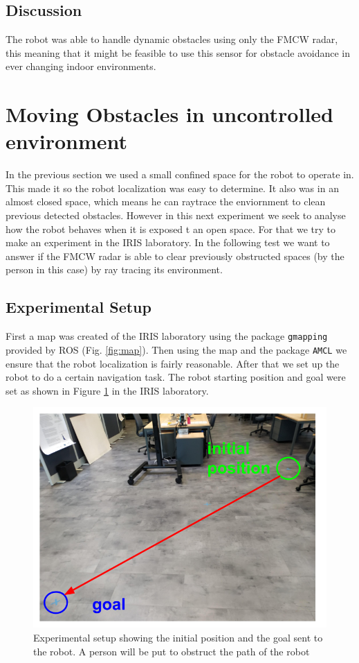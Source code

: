 \subsection{Discussion}
The robot was able to handle dynamic obstacles using only the \ac{FMCW} \ac{radar}, this meaning that it might be feasible to use this sensor for obstacle avoidance in ever changing indoor environments.

\section {Moving Obstacles in uncontrolled environment}
In the previous section we used a small confined space for the robot to operate in. This made it so the robot localization was easy to determine. It also was in an almost closed space, which means he can raytrace the enviornment to clean previous detected obstacles. However in this next experiment we seek to analyse how the robot behaves when it is exposed t an open space. For that we try to make an experiment in the \ac{IRIS} laboratory.
In the following test we want to answer  if the \ac{FMCW} \ac{radar} is  able to clear previously obstructed spaces (by the person in this case) by ray tracing its environment. 
\subsection{Experimental Setup}
First a map was created of the \ac{IRIS} laboratory using the package \texttt{gmapping} provided by \ac{ROS} (Fig. \ref{fig:map}). Then using the map and the package \texttt{\ac{AMCL}} we ensure that the robot localization is fairly reasonable. After that we set up the robot to do a certain navigation task.
The robot starting position and goal were set as shown in Figure \ref{fig:setup} in the \ac{IRIS} laboratory. 

\begin{figure}[ht!]
\centerline{\includegraphics [width=0.8 \textwidth]{imgs/chapter5/setup.png}}
\caption[Experimental setup]{Experimental setup showing the initial position and the goal sent to the robot. A person will be put to obstruct the path of the robot}
\label{fig:setup}
\end{figure}


